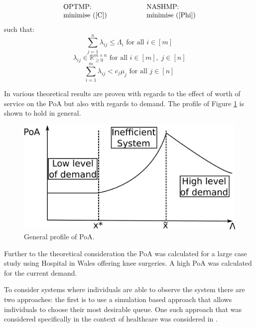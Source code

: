 \documentclass[a4paper,11pt]{article}
\begin{document}
$$\begin{array}{l@{\hspace{2cm}}l}\text{OPTMP:}&\text{NASHMP:}\\
\text{minimise }(\ref{C})&\text{minimise }(\ref{Phi})
\end{array}$$
such that:
\begin{equation}
\sum_{j=1}^n\lambda_{ij}\leq\Lambda_{i}\text{ for all }i\in[m]\label{constraint 1}
\end{equation}
\begin{equation}
\lambda_{ij}\in\mathbb{R}^{m\times n}_{\geq 0}\text{ for all }i\in[m],\;j\in[n]\label{constraint 2}
\end{equation}
\begin{equation}
\sum_{i=1}^m\lambda_{ij}<c_j\mu_j\text{ for all }j\in[n]\label{constraint 3}
\end{equation}

In \cite{Knight2013} various theoretical results are proven with regards to the effect of worth of service on the PoA but also with regards to demand.
The profile of Figure \ref{fig:poaprofile} is shown to hold in general.

\begin{figure}[!hbtp]
\begin{center}
\includegraphics[width=.7\textwidth]{./Images/PoAPlotForSimpleDiagram.pdf}
\end{center}
\caption{General profile of PoA.}\label{fig:poaprofile}
\end{figure}

Further to the theoretical consideration the PoA was calculated for a large case study using Hospital in Wales offering knee surgeries.
A high PoA was calculated for the current demand.

To consider systems where individuals are able to observe the system there are two approaches: the first is to use a simulation based approach that allows individuals to choose their most desirable queue.
One such approach that was considered specifically in the context of healthcare was considered in \cite{Knight2010}.
\end{document}
